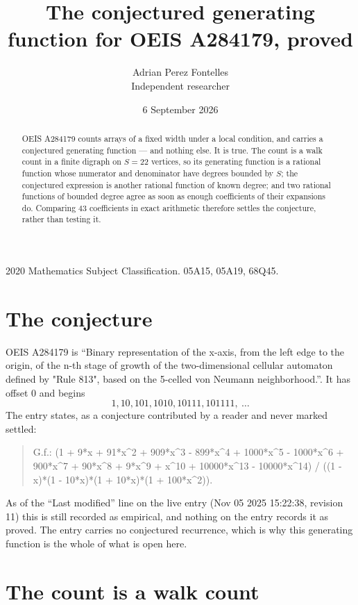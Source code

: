 \documentclass[11pt,a4paper]{article}
\title{The conjectured generating function for OEIS A284179, proved}
\author{Adrian Perez Fontelles\\ \small Independent researcher}
\date{6 September 2026}
\theoremstyle{plain}
\theoremstyle{definition}
\begin{document}
\maketitle

\begin{abstract}
OEIS A284179 counts arrays of a fixed width under a local condition, and carries a conjectured
generating function --- and nothing else. It is true. The count is a walk count in a finite
digraph on $S=22$ vertices, so its generating function is a rational function whose numerator
and denominator have degrees bounded by $S$; the conjectured expression is another rational
function of known degree; and two rational functions of bounded degree agree as soon as enough
coefficients of their expansions do. Comparing $43$ coefficients in exact arithmetic
therefore settles the conjecture, rather than testing it.
\end{abstract}

\noindent\small 2020 Mathematics Subject Classification. 05A15, 05A19, 68Q45.\normalsize

\section{The conjecture}

OEIS A284179 is ``Binary representation of the x-axis, from the left edge to the origin, of the n-th stage of growth of the two-dimensional cellular automaton defined by "Rule 813", based on the 5-celled von Neumann neighborhood.''. It has offset $0$ and begins
\[
1, 10, 101, 1010, 10111, 101111,\ \dots
\]
The entry states, as a conjecture contributed by a reader and never marked settled:
\begin{quote}
G.f.: (1 + 9*x + 91*x\^{}2 + 909*x\^{}3 - 899*x\^{}4 + 1000*x\^{}5 - 1000*x\^{}6 + 900*x\^{}7 + 90*x\^{}8 + 9*x\^{}9 + x\^{}10 + 10000*x\^{}13 - 10000*x\^{}14) / ((1 - x)*(1 - 10*x)*(1 + 10*x)*(1 + 100*x\^{}2)).
\end{quote}
As of the ``Last modified'' line on the live entry (Nov 05 2025 15:22:38, revision 11) this is still
recorded as empirical, and nothing on the entry records it as proved. The entry carries no
conjectured recurrence, which is why this generating function is the whole of what is open
here.

\section{The count is a walk count}
\end{document}
